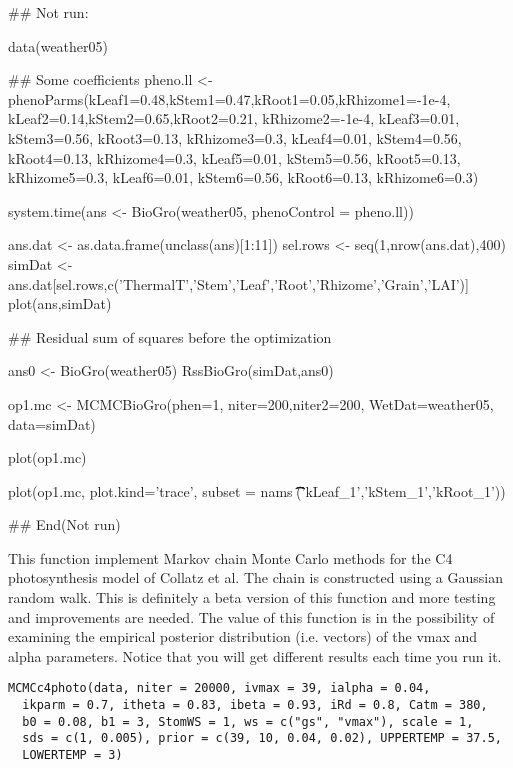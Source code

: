\documentclass[letterpaper]{book}
\begin{document}
%
\begin{Examples}
\begin{ExampleCode}
## Not run: 

data(weather05)

## Some coefficients
pheno.ll <- phenoParms(kLeaf1=0.48,kStem1=0.47,kRoot1=0.05,kRhizome1=-1e-4,
                       kLeaf2=0.14,kStem2=0.65,kRoot2=0.21, kRhizome2=-1e-4,
                       kLeaf3=0.01, kStem3=0.56, kRoot3=0.13, kRhizome3=0.3,
                       kLeaf4=0.01, kStem4=0.56, kRoot4=0.13, kRhizome4=0.3,
                       kLeaf5=0.01, kStem5=0.56, kRoot5=0.13, kRhizome5=0.3,
                       kLeaf6=0.01, kStem6=0.56, kRoot6=0.13, kRhizome6=0.3)

system.time(ans <- BioGro(weather05, phenoControl = pheno.ll))

ans.dat <- as.data.frame(unclass(ans)[1:11])
sel.rows <- seq(1,nrow(ans.dat),400)
simDat <- ans.dat[sel.rows,c('ThermalT','Stem','Leaf','Root','Rhizome','Grain','LAI')]
plot(ans,simDat)

## Residual sum of squares before the optimization

ans0 <- BioGro(weather05)
RssBioGro(simDat,ans0)


op1.mc <- MCMCBioGro(phen=1, niter=200,niter2=200,
                     WetDat=weather05,
                     data=simDat)


plot(op1.mc)

plot(op1.mc, plot.kind='trace', subset = nams %
\t\t\t\tc('kLeaf_1','kStem_1','kRoot_1'))


## End(Not run)
\end{ExampleCode}
\end{Examples}
%
\begin{Description}\relax
This function implement Markov chain Monte Carlo methods
for the C4 photosynthesis model of Collatz et al.  The
chain is constructed using a Gaussian random walk. This is
definitely a beta version of this function and more testing
and improvements are needed. The value of this function is
in the possibility of examining the empirical posterior
distribution (i.e. vectors) of the vmax and alpha
parameters.  Notice that you will get different results
each time you run it.
\end{Description}
%
\begin{Usage}
\begin{verbatim}
MCMCc4photo(data, niter = 20000, ivmax = 39, ialpha = 0.04,
  ikparm = 0.7, itheta = 0.83, ibeta = 0.93, iRd = 0.8, Catm = 380,
  b0 = 0.08, b1 = 3, StomWS = 1, ws = c("gs", "vmax"), scale = 1,
  sds = c(1, 0.005), prior = c(39, 10, 0.04, 0.02), UPPERTEMP = 37.5,
  LOWERTEMP = 3)
\end{verbatim}
\end{Usage}
\end{document}
